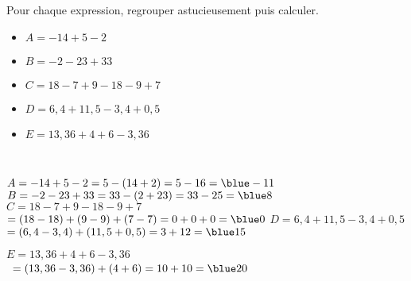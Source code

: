 \begin{exercice*}
   Pour chaque expression, regrouper astucieusement puis calculer.
   \begin{itemize}
      \item[] $A =-14+5-2$
      \item[] $B =-2-23+33$
      \item[] $C =18-7+9-18-9+7$
      \item[] $D =6,4+11,5-3,4+0,5$
      \item[] $E =13,36+4+6-3,36$
   \end{itemize}
\end{exercice*}

\begin{corrige}
   \ \\[-5mm]
   \begin{itemize}
      \def\item{}
      \item $A =-14+5-2 =5-(14+2) =5-16 =\blue -11$
      \item $B =-2-23+33 =33-(2+23) =33-25 =\blue 8$
      \item $C =18-7+9-18-9+7$ \\
          \qquad\; $=(18-18)+(9-9)+(7-7) =0+0+0 =\blue 0$
      \item $D =6,4+11,5-3,4+0,5$ \\
         \qquad\; $=(6,4-3,4)+(11,5+0,5) =3+12 =\blue 15$
   \end{itemize}
   
\Coupe

   \begin{itemize}
      \def\item{}   
      \item $E =13,36+4+6-3,36$ \\
         \qquad\, $=(13,36-3,36)+(4+6) =10+10 =\blue 20$
   \end{itemize}
\end{corrige}

